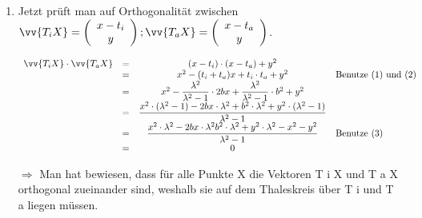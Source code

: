\begin{\small}
\begin{Beweis}
\begin{enumerate}
  \item
  Jetzt prüft man auf Orthogonalität zwischen $\vv{T_{i}X} = \left(\begin{array}{c} x-t_{i} \\ y \end{array}\right); \vv{T_{a}X} = \left(\begin{array}{c} x-t_{a} \\ y \end{array}\right)$.\\
  \begin{center}
  $\begin{array}{rccl}
    \vv{T_{i}X} \cdot \vv{T_{a}X} & = & (x-t_{i})\cdot (x-t_{a}) +y^2                                                                                       & \\
                                  & = & x^2 -(t_{i} +t_{a})x + t_{i}\cdot t_{a} + y^2                                                                       & \text{Benutze (1) und (2)} \\
                                  & = & x^2 - \dfrac{\lambda^2}{\lambda^2 - 1} \cdot 2bx + \dfrac{\lambda^2}{\lambda^2 - 1} \cdot b^2 +y^2                  & \\
                                  & = & \dfrac{x^2 \cdot (\lambda^2 -1) - 2bx\cdot \lambda^2 + b^2\cdot \lambda^2 + y^2 \cdot (\lambda^2 -1)}{\lambda^2 -1} & \\
                                  & = & \dfrac{x^2 \cdot \lambda^2 - 2bx\cdot \lambda^2 b^2\cdot \lambda^2 +y^2\cdot \lambda^2 -x^2 -y^2} {\lambda^2 -1}    & \text{Benutze (3)} \\
                                  & = & 0                                                                                                                   & \\
  \end{array}$
  \end{center}

  $\Rightarrow$ Man hat bewiesen, dass für alle Punkte X die Vektoren T i X und T a X orthogonal zueinander sind, weshalb sie auf dem Thaleskreis über T i und T a liegen müssen.
  \end{enumerate}
\end{Beweis}


\end{\small}
